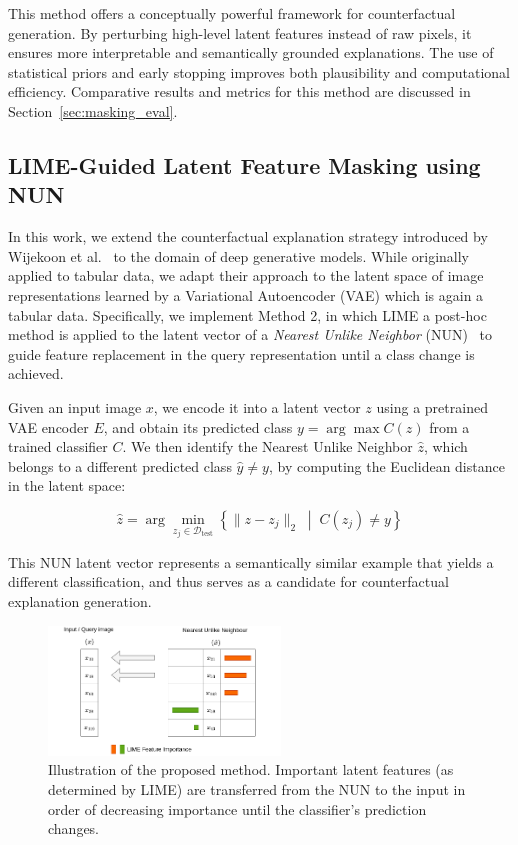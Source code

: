 This method offers a conceptually powerful framework for counterfactual generation. By perturbing high-level latent features instead of raw pixels, it ensures more interpretable and semantically grounded explanations. The use of statistical priors and early stopping improves both plausibility and computational efficiency. Comparative results and metrics for this method are discussed in Section~\ref{sec:masking_eval}.



\clearpage

\subsection{LIME-Guided Latent Feature Masking using NUN} \label{lime_with_NUN}

In this work, we extend the counterfactual explanation strategy introduced by Wijekoon et al.~\cite{WijekoonWNMPC21} to the domain of deep generative models. While originally applied to tabular data, we adapt their approach to the latent space of image representations learned by a Variational Autoencoder (VAE) which is again a tabular data. Specifically, we implement Method 2, in which LIME a post-hoc method is applied to the latent vector of a \textit{Nearest Unlike Neighbor} (NUN)~\cite{DELANEY2023103995} to guide feature replacement in the query representation until a class change is achieved.

Given an input image \( x \), we encode it into a latent vector \( z \) using a pretrained VAE encoder \( E \), and obtain its predicted class \( y = \arg\max C(z) \) from a trained classifier \( C \). We then identify the Nearest Unlike Neighbor \( \hat{z} \), which belongs to a different predicted class \( \hat{y} \ne y \), by computing the Euclidean distance in the latent space:

\[
\hat{z} = \arg\min_{z_j \in \mathcal{D}_{\text{test}}} \left\{ \| z - z_j \|_2 \; \middle| \; C(z_j) \ne y \right\}
\]

This NUN latent vector represents a semantically similar example that yields a different classification, and thus serves as a candidate for counterfactual explanation generation.

\begin{figure}[h]
    \centering
    \includegraphics[width=0.55\textwidth]{img/masking/lime_on_latent_nun/NUN_method.drawio.png}
    \caption[Concept of LIME with NUN feature transfer]{%
Illustration of the proposed method. Important latent features (as determined by LIME) are transferred from the NUN to the input in order of decreasing importance until the classifier's prediction changes.}
    \label{fig:nun_lime_concept}
\end{figure}


